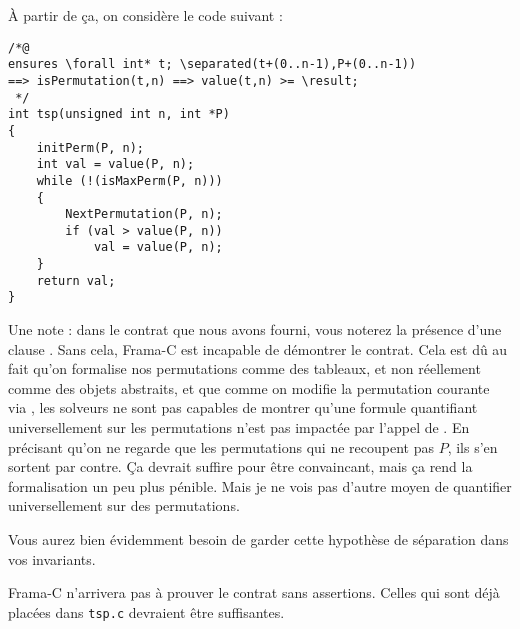 \documentclass[11pt,answers]{exam}
\begin{document}
\begin{questions}
    À partir de ça, on considère le code suivant :

    \begin{lstlisting}
/*@
ensures \forall int* t; \separated(t+(0..n-1),P+(0..n-1))
==> isPermutation(t,n) ==> value(t,n) >= \result;
 */
int tsp(unsigned int n, int *P)
{
    initPerm(P, n);
    int val = value(P, n);
    while (!(isMaxPerm(P, n)))
    {
        NextPermutation(P, n);
        if (val > value(P, n))
            val = value(P, n);
    }
    return val;
}
    \end{lstlisting}

    Une note : dans le contrat que nous avons fourni, vous noterez la présence d’une clause \code{\\separated}. Sans cela, Frama-C est incapable de démontrer le contrat. Cela est dû au fait qu’on formalise nos permutations comme des tableaux, et non réellement comme des objets abstraits, et que comme on modifie la permutation courante via , les solveurs ne sont pas capables de montrer qu’une formule quantifiant universellement sur les permutations n’est pas impactée par l’appel de . En précisant qu’on ne regarde que les permutations qui ne recoupent pas $P$, ils s’en sortent par contre.
    Ça devrait suffire pour être convaincant, mais ça rend la formalisation un peu plus pénible. Mais je ne vois pas d’autre moyen de quantifier universellement sur des permutations.

    Vous aurez bien évidemment besoin de garder cette hypothèse de séparation dans vos invariants.

    Frama-C n’arrivera pas à prouver le contrat sans assertions. Celles qui sont déjà placées dans \texttt{tsp.c} devraient être suffisantes.

\end{questions}
\end{document}
